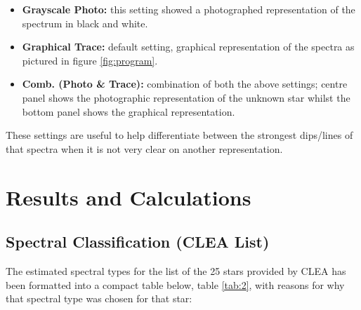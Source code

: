 \documentclass[12pt]{article}
\begin{document}
\begin{itemize}
    \item \textbf{Grayscale Photo:} this setting showed a photographed representation of the spectrum in black and white.
    \item \textbf{Graphical Trace:} default setting, graphical representation of the spectra as pictured in figure \ref{fig:program}.
    \item \textbf{Comb. (Photo \& Trace):} combination of both the above settings; centre panel shows the photographic representation of the unknown star whilst the bottom panel shows the graphical representation.
\end{itemize}

These settings are useful to help differentiate between the strongest dips/lines of that spectra when it is not very clear on another representation.

\section{Results and Calculations} \label{sec:3}

\subsection{Spectral Classification (CLEA List)}

The estimated spectral types for the list of the 25 stars provided by CLEA has been formatted into a compact table below, table \ref{tab:2}, with reasons for why that spectral type was chosen for that star:
\end{document}
